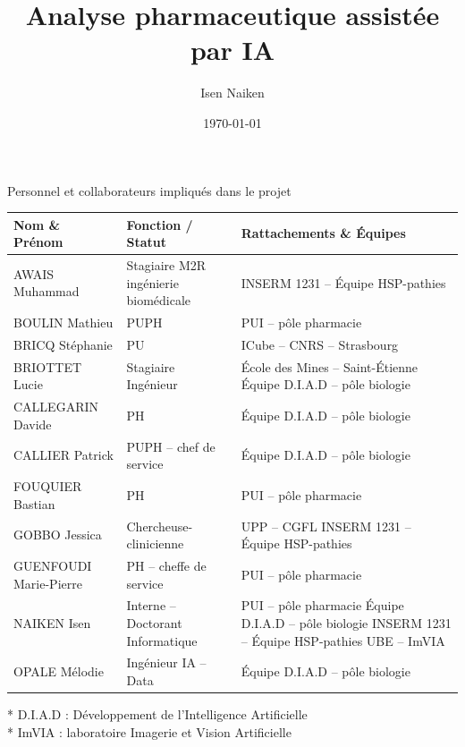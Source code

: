 \documentclass{beamer}
\title{Analyse pharmaceutique assistée par IA}
\author{Isen Naiken}
\institute{CHU Dijon Bourgogne}
\date{\today}
\begin{document}
\begin{frame}
  \titlepage
\end{frame}

\begin{frame}{Personnel et collaborateurs impliqués dans le projet}
  \centering
  \scriptsize
  \renewcommand{\arraystretch}{1.0}
  \setlength{\tabcolsep}{4pt}
  \begin{tabular}{>{\raggedright\arraybackslash}p{2.9cm}>{\raggedright\arraybackslash}p{3.0cm}>{\raggedright\arraybackslash}p{5.0cm}}
    \toprule
    \textbf{Nom \& Prénom} & \textbf{Fonction / Statut} & \textbf{Rattachements \& Équipes} \\
    \midrule
    AWAIS Muhammad & Stagiaire M2R ingénierie biomédicale & INSERM 1231 -- Équipe HSP-pathies \\
    BOULIN Mathieu & PUPH & PUI -- pôle pharmacie \\
    BRICQ Stéphanie & PU & ICube -- CNRS -- Strasbourg \\
    BRIOTTET Lucie & Stagiaire Ingénieur & École des Mines -- Saint-Étienne \newline Équipe D.I.A.D -- pôle biologie \\
    CALLEGARIN Davide & PH & Équipe D.I.A.D -- pôle biologie \\
    CALLIER Patrick & PUPH -- chef de service & Équipe D.I.A.D -- pôle biologie \\
    FOUQUIER Bastian & PH & PUI -- pôle pharmacie \\
    GOBBO Jessica & Chercheuse-clinicienne & UPP -- CGFL \newline INSERM 1231 -- Équipe HSP-pathies \\
    GUENFOUDI Marie-Pierre & PH -- cheffe de service & PUI -- pôle pharmacie \\
    NAIKEN Isen & Interne -- Doctorant Informatique & PUI -- pôle pharmacie \newline Équipe D.I.A.D -- pôle biologie \newline INSERM 1231 -- Équipe HSP-pathies \newline UBE -- ImVIA \\
    OPALE Mélodie & Ingénieur IA -- Data & Équipe D.I.A.D -- pôle biologie \\
    \bottomrule
  \end{tabular}

  \vspace{0.3em}
  \raggedright
  \tiny
  * D.I.A.D : Développement de l'Intelligence Artificielle \\
  * ImVIA : laboratoire Imagerie et Vision Artificielle
\end{frame}
\end{document}
